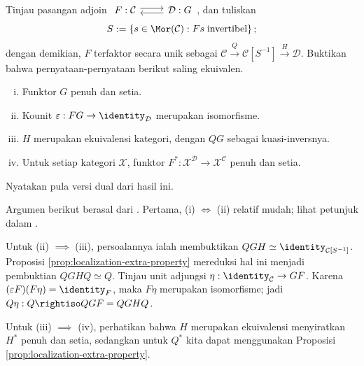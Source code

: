 \begin{Exercises}
	\item Tinjau pasangan adjoin
	$\begin{tikzcd}
		F: \mathcal{C} \arrow[r, shift left] & \mathcal{D} \arrow[l, shift left] : G
	\end{tikzcd}$,
	dan tuliskan
	\[ S := \left\{ s \in \Mor(\mathcal{C}): Fs \;\text{invertibel} \right\}; \]
	dengan demikian, $F$ terfaktor secara unik sebagai
	$\mathcal{C}\xrightarrow{Q}\mathcal{C}[S^{-1}]\xrightarrow{H}\mathcal{D}$.
	Buktikan bahwa pernyataan-pernyataan berikut saling ekuivalen.
	\begin{enumerate}[(i)]
		\item Funktor $G$ penuh dan setia.
		\item Kounit $\varepsilon:FG\to\identity_{\mathcal{D}}$ merupakan
		isomorfisme.
		\item $H$ merupakan ekuivalensi kategori, dengan $QG$ sebagai
		kuasi-inversnya.
		\item Untuk setiap kategori $\mathcal{X}$, funktor
		$F^*:\mathcal{X}^{\mathcal{D}}\to\mathcal{X}^{\mathcal{C}}$ penuh dan
		setia.
	\end{enumerate}
	Nyatakan pula versi dual dari hasil ini.

	\begin{hint}
		Argumen berikut berasal dari \cite[Proposisi I.1.3]{GZ67}. Pertama,
		(i) $\iff$ (ii) relatif mudah; lihat petunjuk dalam
		\cite[Bab 2, Latihan 8]{Li1}.

		Untuk (ii) $\implies$ (iii), persoalannya ialah membuktikan
		$QGH\simeq\identity_{\mathcal{C}[S^{-1}]}$. Proposisi
		\ref{prop:localization-extra-property} mereduksi hal ini menjadi
		pembuktian $QGHQ\simeq Q$. Tinjau unit adjungsi
		$\eta:\identity_{\mathcal{C}}\to GF$. Karena
		$(\varepsilon F)(F\eta)=\identity_F$, maka $F\eta$ merupakan
		isomorfisme; jadi $Q\eta:Q\rightiso QGF=QGHQ$.

		Untuk (iii) $\implies$ (iv), perhatikan bahwa $H$ merupakan ekuivalensi
		menyiratkan $H^*$ penuh dan setia, sedangkan untuk $Q^*$ kita dapat
		menggunakan Proposisi \ref{prop:localization-extra-property}.


\end{hint}
\end{Exercises}
